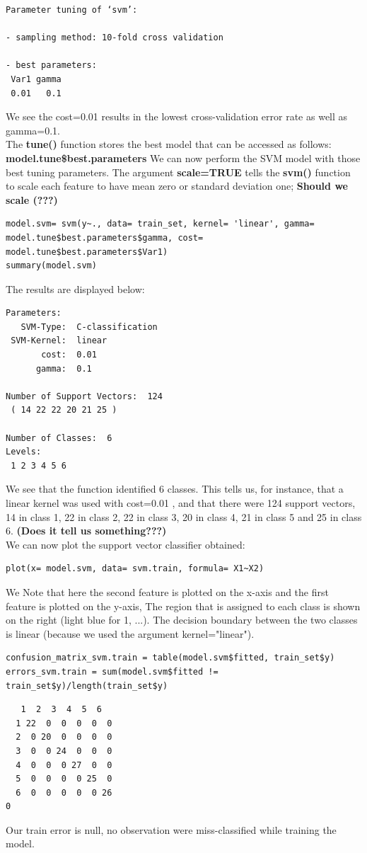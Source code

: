 \documentclass[]{report}
\begin{document}
\begin{verbatim}
Parameter tuning of ‘svm’:

- sampling method: 10-fold cross validation 

- best parameters:
 Var1 gamma
 0.01   0.1
\end{verbatim}
We see the cost=0.01 results in the lowest cross-validation error rate as well as gamma=0.1.\\
The \textbf{tune()} function stores the best model that can be accessed as follows: \textbf{model.tune\$best.parameters} We can now perform the SVM model with those best tuning parameters.
The argument \textbf{scale=TRUE} tells the \textbf{svm()} function to scale each feature to have mean zero or standard deviation one;\textbf{ Should we scale (???)}

\begin{lstlisting}
model.svm= svm(y~., data= train_set, kernel= 'linear', gamma= model.tune$best.parameters$gamma, cost= model.tune$best.parameters$Var1)
summary(model.svm)
\end{lstlisting}

The results are displayed below:
\begin{verbatim}
Parameters:
   SVM-Type:  C-classification 
 SVM-Kernel:  linear 
       cost:  0.01 
      gamma:  0.1 

Number of Support Vectors:  124
 ( 14 22 22 20 21 25 )

Number of Classes:  6 
Levels: 
 1 2 3 4 5 6
\end{verbatim}
We see that the function identified 6 classes. This tells us, for instance, that a linear kernel was used with cost=0.01 , and that there were 124 support vectors, 14 in class 1, 22 in class 2, 22 in class 3, 20 in class 4, 21 in class 5 and 25 in class 6. \textbf{(Does it tell us something???)}
\\
We can now plot the support vector classifier obtained:
\begin{lstlisting}
plot(x= model.svm, data= svm.train, formula= X1~X2)
\end{lstlisting}
We Note that here the second feature is plotted on the x-axis and the first feature is plotted on the y-axis, 
The region that is assigned to each class is shown on the right (light blue for 1, ...). The decision boundary between the two classes is linear 
(because we used the argument kernel="linear"). 

\begin{lstlisting}
confusion_matrix_svm.train = table(model.svm$fitted, train_set$y)
errors_svm.train = sum(model.svm$fitted != train_set$y)/length(train_set$y)
\end{lstlisting}
\begin{verbatim}
   1  2  3  4  5  6
  1 22  0  0  0  0  0
  2  0 20  0  0  0  0
  3  0  0 24  0  0  0
  4  0  0  0 27  0  0
  5  0  0  0  0 25  0
  6  0  0  0  0  0 26
0
\end{verbatim}
Our train error is null, no observation were miss-classified while training the model.
\end{document}
